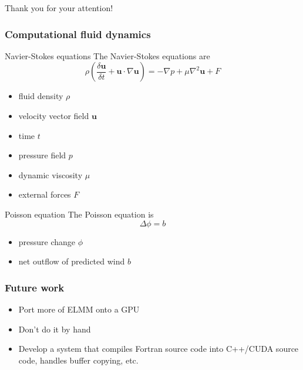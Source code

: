\documentclass{beamer}
\begin{document}
\begin{frame}[c]{}
    \centering
        \Huge Thank you for your attention!
\end{frame}


\begin{frame}[noframenumbering]
    \frametitle{Computational fluid dynamics}
    \begin{block}{Navier-Stokes equations}
        The Navier-Stokes equations are
        \[
            \rho (\frac{\delta \mathbf{u}}{\delta t} + \mathbf{u} \cdot \nabla \mathbf{u}) = -\nabla p + \mu\nabla^2 \mathbf{u} + F
        \]
        \begin{itemize}
            \item fluid density $\rho$
            \item velocity vector field $\mathbf{u}$
            \item time $t$
            \item pressure field $p$
            \item dynamic viscosity $\mu$
            \item external forces $F$
        \end{itemize}
    \end{block}
    \begin{block}{Poisson equation}
        The Poisson equation is
        \[
            \Delta \phi = b
        \]
        \begin{itemize}
            \item pressure change $\phi$
            \item net outflow of predicted wind $b$
        \end{itemize}
    \end{block}
\end{frame}

\begin{frame}[noframenumbering]
    \frametitle{Future work}
    \begin{itemize}
        \item Port more of ELMM onto a GPU\pause
        \item Don't do it by hand\pause
        \item Develop a system that compiles Fortran source code into C++/CUDA source code, handles buffer copying, etc.
    \end{itemize}
\end{frame}
\end{document}
